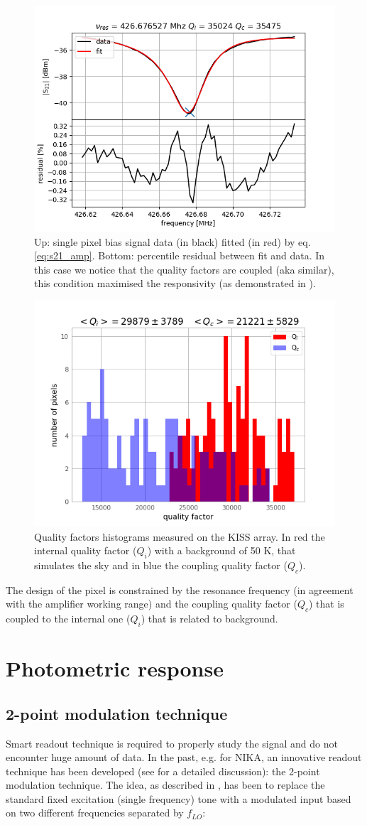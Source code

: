 \documentclass[twocolumn,traditabstract]{aa}\\
\begin{document}
\begin{figure}[htf]
	\centering
	\includegraphics[width=.5\textwidth]{3.acqui/resonance_fit.png}
	\caption{Up: single pixel bias signal data (in black) fitted (in red) by eq. \ref{eq:s21_amp}. Bottom: percentile residual between fit and data. In this case we notice that the quality factors are coupled (aka similar), this condition maximised the responsivity (as demonstrated in \cite{Gao}).}
	\label{fig:fit_amp}
\end{figure}

\begin{figure}[htf]
	\centering
	\includegraphics[width=.5\textwidth]{3.acqui/Q_hist.png}
	\caption{Quality factors histograms measured on the KISS array. In red the internal quality factor ($Q_i$) with a background of 50 K, that simulates the sky and in blue the coupling quality factor ($Q_c$).}
	\label{fig:hist}
\end{figure}

\noindent The design of the pixel is constrained by the resonance frequency (in agreement with the amplifier working range) and the coupling quality factor ($Q_c$) that is coupled to the internal one ($Q_i$) that is related to background.

\section{Photometric response}
\label{sec:photo}

\subsection{2-point modulation technique}
\label{2-point}
Smart readout technique is required to properly study the signal and do not encounter huge amount of data. In the past, e.g. for NIKA, an innovative readout technique has been developed (see \cite{Calvo2013} for a detailed discussion): the 2-point modulation technique.
The idea, as described in \cite{Catalano2014} , has been to replace the standard fixed excitation (single frequency) tone with a modulated input based on two different frequencies separated by $f_{LO}$: 
\end{document}
